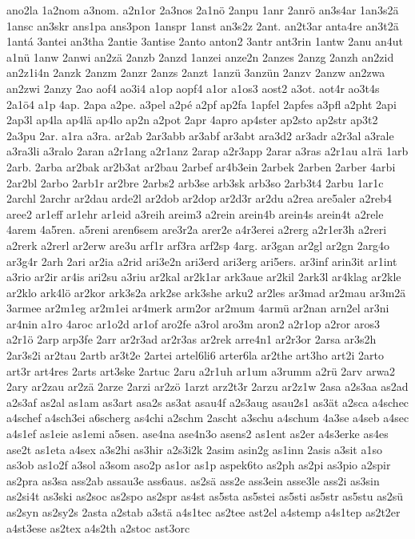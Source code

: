{ano2la
1a2nom
a3nom.
a2n1or
2a3nos
2a1nö
2anpu
1anr
2anrö
an3s4ar
1an3s2ä
1ansc
an3skr
ans1pa
ans3pon
1anspr
1anst
an3s2z
2ant.
an2t3ar
anta4re
an3t2ä
1antá
3antei
an3tha
2antie
3antise
2anto
anton2
3antr
ant3rin
1antw
2anu
an4ut
a1nü
1anw
2anwi
an2zä
2anzb
2anzd
1anzei
anze2n
2anzes
2anzg
2anzh
an2zid
an2z1i4n
2anzk
2anzm
2anzr
2anzs
2anzt
1anzü
3anzün
2anzv
2anzw
an2zwa
an2zwi
2anzy
2ao
aof4
ao3i4
a1op
aopf4
a1or
a1os3
aost2
a3ot.
aot4r
ao3t4s
2a1ö4
a1p
4ap.
2apa
a2pe.
a3pel
a2pé
a2pf
ap2fa
1apfel
2apfes
a3pfl
a2pht
2api
2ap3l
ap4la
ap4lä
ap4lo
ap2n
a2pot
2apr
4apro
ap4ster
ap2sto
ap2str
ap3t2
2a3pu
2ar.
a1ra
a3ra.
ar2ab
2ar3abb
ar3abf
ar3abt
ara3d2
ar3adr
a2r3al
a3rale
a3ra3li
a3ralo
2aran
a2r1ang
a2r1anz
2arap
a2r3app
2arar
a3ras
a2r1au
a1rä
1arb
2arb.
2arba
ar2bak
ar2b3at
ar2bau
2arbef
ar4b3ein
2arbek
2arben
2arber
4arbi
2ar2bl
2arbo
2arb1r
ar2bre
2arbs2
arb3se
arb3sk
arb3so
2arb3t4
2arbu
1ar1c
2archl
2archr
ar2dau
arde2l
ar2dob
ar2dop
ar2d3r
ar2du
a2rea
are5aler
a2reb4
aree2
ar1eff
ar1ehr
ar1eid
a3reih
areim3
a2rein
arein4b
arein4s
arein4t
a2rele
4arem
4a5ren.
a5reni
aren6sem
are3r2a
arer2e
a4r3erei
a2rerg
a2r1er3h
a2reri
a2rerk
a2rerl
ar2erw
are3u
arf1r
arf3ra
arf2sp
4arg.
ar3gan
ar2gl
ar2gn
2arg4o
ar3g4r
2arh
2ari
ar2ia
a2rid
ari3e2n
ari3erd
ari3erg
ari5ers.
ar3inf
arin3it
ar1int
a3rio
ar2ir
ar4is
ari2su
a3riu
ar2kal
ar2k1ar
ark3aue
ar2kil
2ark3l
ar4klag
ar2kle
ar2klo
ark4lö
ar2kor
ark3s2a
ark2se
ark3she
arku2
ar2les
ar3mad
ar2mau
ar3m2ä
3armee
ar2m1eg
ar2m1ei
ar4merk
arm2or
ar2mum
4armü
ar2nan
arn2el
ar3ni
ar4nin
a1ro
4aroc
ar1o2d
ar1of
aro2fe
a3rol
aro3m
aron2
a2r1op
a2ror
aros3
a2r1ö
2arp
arp3fe
2arr
ar2r3ad
ar2r3as
ar2rek
arre4n1
ar2r3or
2arsa
ar3s2h
2ar3s2i
ar2tau
2artb
ar3t2e
2artei
artel6li6
arter6la
ar2the
art3ho
art2i
2arto
art3r
art4res
2arts
art3ske
2artuc
2aru
a2r1uh
ar1um
a3rumm
a2rü
2arv
arwa2
2ary
ar2zau
ar2zä
2arze
2arzi
ar2zö
1arzt
arz2t3r
2arzu
ar2z1w
2asa
a2s3aa
as2ad
a2s3af
as2al
as1am
as3art
asa2s
as3at
asau4f
a2s3aug
asau2s1
as3ät
a2sca
a4schec
a4schef
a4sch3ei
a6scherg
as4chi
a2schm
2ascht
a3schu
a4schum
4a3se
a4seb
a4sec
a4s1ef
as1eie
as1emi
a5sen.
ase4na
ase4n3o
asens2
as1ent
as2er
a4s3erke
as4es
ase2t
as1eta
a4sex
a3s2hi
as3hir
a2s3i2k
2asim
asin2g
as1inn
2asis
a3sit
a1so
as3ob
as1o2f
a3sol
a3som
aso2p
as1or
as1p
aspek6to
as2ph
as2pi
as3pio
a2spir
as2pra
as3sa
ass2ab
assau3e
ass6aus.
as2sä
ass2e
ass3ein
asse3le
ass2i
as3sin
as2si4t
as3ski
as2soc
as2spo
as2spr
as4st
as5sta
as5stei
as5sti
as5str
as5stu
as2sü
as2syn
as2sy2s
2asta
a2stab
a3stä
a4s1tec
as2tee
ast2el
a4stemp
a4s1tep
as2t2er
a4st3ese
as2tex
a4s2th
a2stoc
ast3orc
}

